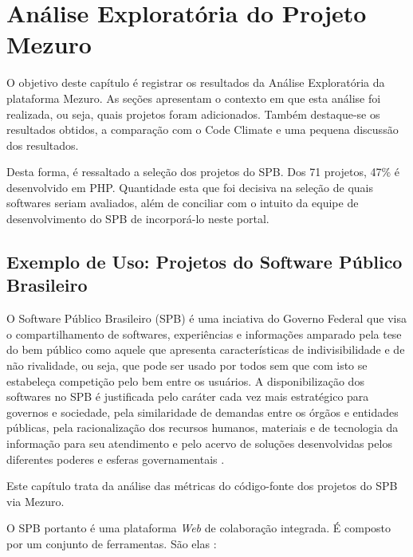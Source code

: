 \chapter{Análise Exploratória do Projeto Mezuro}\label{chap:analise_exploratoria}

O objetivo deste capítulo é registrar os resultados da Análise Exploratória da
plataforma Mezuro. As seções apresentam o contexto em que esta análise foi
realizada, ou seja, quais projetos foram adicionados. Também destaque-se os
resultados obtidos, a comparação com o Code Climate e uma pequena discussão dos
resultados.

Desta forma, é ressaltado a seleção dos projetos do SPB. Dos 71 projetos, 47\% é
desenvolvido em PHP. Quantidade esta que foi decisiva na seleção de quais
softwares seriam avaliados, além de conciliar com o intuito da equipe de
desenvolvimento do SPB de incorporá-lo neste portal.

\section{Exemplo de Uso: Projetos do Software Público Brasileiro}

O Software Público Brasileiro (SPB) é uma inciativa do Governo Federal que visa
o compartilhamento de softwares, experiências e informações amparado pela tese
do bem público como aquele que apresenta características de indivisibilidade e
de não rivalidade, ou seja, que pode ser usado por todos sem que com isto se
estabeleça competição pelo bem entre os usuários. A disponibilização dos
softwares no SPB é justificada pelo caráter cada vez mais estratégico para
governos e sociedade, pela similaridade de demandas entre os órgãos e entidades
públicas, pela racionalização dos recursos humanos, materiais e de tecnologia
da informação para seu atendimento e pelo acervo de soluções desenvolvidas
pelos diferentes poderes e esferas governamentais \cite{santos2011in01}.

Este capítulo trata da análise das métricas do código-fonte dos projetos do SPB
via Mezuro.

O SPB portanto é uma plataforma \textit{Web} de colaboração integrada. É composto por um
conjunto de ferramentas. São elas \cite{aboutSPB}:

